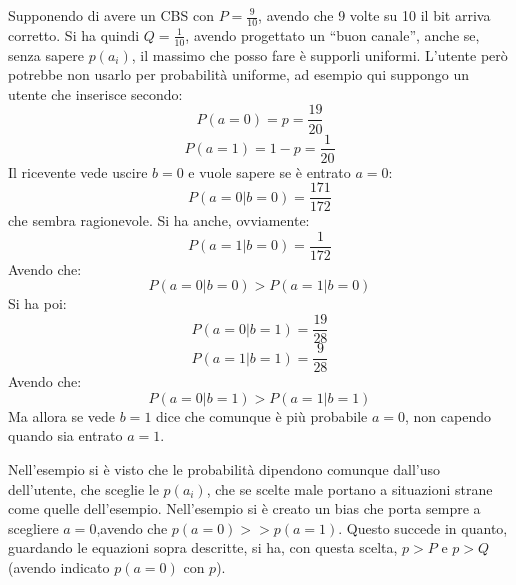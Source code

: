 \documentclass[a4paper,12pt, oneside]{book}
\begin{document}
\begin{esempio}
  Supponendo di avere un CBS con $P=\frac{9}{10}$, avendo che 9 volte su 10 il
  bit 
  arriva corretto. Si ha quindi $Q=\frac{1}{10}$, avendo progettato un ``buon
  canale'', anche se, senza sapere $p(a_i)$, il massimo che posso fare è
  supporli 
  uniformi. L'utente però potrebbe non usarlo per probabilità uniforme, ad
  esempio 
  qui suppongo un utente che inserisce secondo:
  \[P(a=0)=p=\frac{19}{20}\]
  \[P(a=1)=1-p=\frac{1}{20}\]
  Il ricevente vede uscire $b=0$ e vuole sapere se è entrato $a=0$:
  \[P(a=0|b=0)=\frac{171}{172}\]
  che sembra ragionevole. Si ha anche, ovviamente:
  \[P(a=1|b=0)=\frac{1}{172}\]
  Avendo che:
  \[P(a=0|b=0)>P(a=1|b=0)\]
  Si ha poi:
  \[P(a=0|b=1)=\frac{19}{28}\]
  \[P(a=1|b=1)=\frac{9}{28}\]
  Avendo che:
  \[P(a=0|b=1)>P(a=1|b=1)\]
  Ma allora se vede $b=1$ dice che comunque è più probabile $a=0$, non capendo
  quando sia entrato $a=1$.
\end{esempio}
Nell'esempio si è visto che le probabilità dipendono comunque dall'uso
dell'utente, che sceglie le $p(a_i)$, che se scelte male portano a situazioni
strane come quelle dell'esempio. Nell'esempio si è creato un bias che porta
sempre a scegliere $a=0$,avendo che $p(a=0)>>p(a=1)$. Questo succede in quanto,
guardando le equazioni sopra descritte, si ha, con questa scelta, $p>P$ e $p>Q$
(avendo indicato $p(a=0)$ con $p$).
\end{document}
